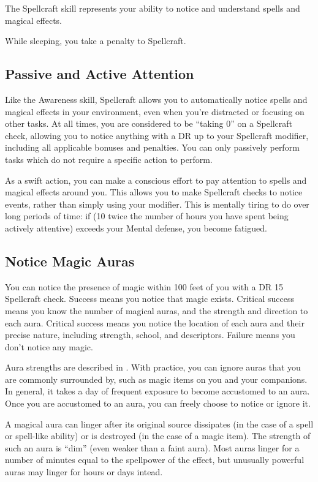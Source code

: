         The Spellcraft skill represents your ability to notice and understand spells and magical effects.

        While sleeping, you take a  penalty to Spellcraft.

    \subsection{Passive and Active Attention}\label{Spellcraft-Passive and Active Attention}
        Like the Awareness skill, Spellcraft allows you to automatically notice spells and magical effects in your environment, even when you're distracted or focusing on other tasks. At all times, you are considered to be ``taking 0'' on a Spellcraft check, allowing you to notice anything with a DR up to your Spellcraft modifier, including all applicable bonuses and penalties. You can only passively perform tasks which do not require a specific action to perform.

        As a swift action, you can make a conscious effort to pay attention to spells and magical effects around you. This allows you to make Spellcraft checks to notice events, rather than simply using your modifier. This is mentally tiring to do over long periods of time: if (10 \add twice the number of hours you have spent being actively attentive) exceeds your Mental defense, you become fatigued.

    \subsection{Notice Magic Auras}
        You can notice the presence of magic within 100 feet of you with a DR 15 Spellcraft check. Success means you notice that magic exists. Critical success means you know the number of magical auras, and the strength and direction to each aura. Critical success means you notice the location of each aura and their precise nature, including strength, school, and descriptors. Failure means you don't notice any magic.

        Aura strengths are described in . With practice, you can ignore auras that you are commonly surrounded by, such as magic items on you and your companions. In general, it takes a day of frequent exposure to become accustomed to an aura. Once you are accustomed to an aura, you can freely choose to notice or ignore it.

        A magical aura can linger after its original source dissipates (in the case of a spell or spell-like ability) or is destroyed (in the case of a magic item). The strength of such an aura is ``dim'' (even weaker than a faint aura). Most auras linger for a number of minutes equal to the spellpower of the effect, but unusually powerful auras may linger for hours or days intead.

